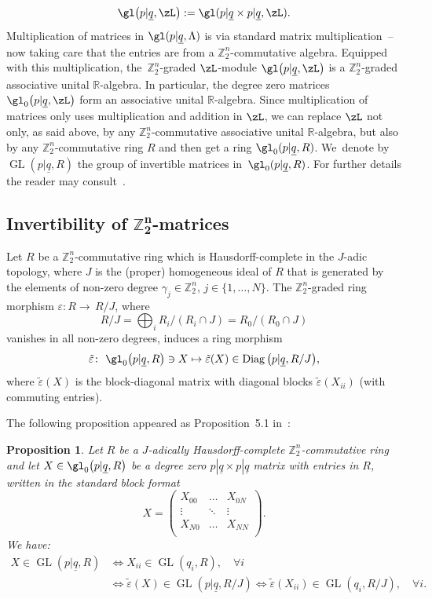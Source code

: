 \documentclass[pdftex]{sigma}%
\newcommand{\op}[1]{\operatorname{#1}}
\DeclareMathOperator{\GL}{GL}
\newcommand{\R}{{\mathbb R}}
\newcommand{\Z}{{\mathbb Z}}
\def\ul{\underline}
\def\ul{\underline}
\newcommand{\0}{\otimes}
\newcommand{\z}{\Z_2^n}
\numberwithin{equation}{section}
\newtheorem{Proposition}[Theorem]{Proposition}
 { \theoremstyle{definition}
\newtheorem{Definition}[Theorem]{Definition}
\newtheorem{Example}[Theorem]{Example}
\newtheorem{Remark}[Theorem]{Remark} }
\begin{document}
\[
\gl\big(p|\ul q,\zL\big):=\gl(p|\ul q \times p|\ul q,\zL).
\]
Multiplication of matrices in $\gl(p|\ul{q},\Lambda)$ is via standard matrix multiplication~-- now taking care that the entries are from a $\Z_2^n$-commutative algebra. Equipped with this multiplication, the~$\z$-graded $\zL$-module $\gl\big(p|\ul q,\zL\big)$ is a $\z$-graded associative unital $\R$-algebra. In particular, the degree zero matrices $\gl_0\big(p|\ul q,\zL\big)$ form an associative unital $\R$-algebra. Since multiplication of matrices only uses multiplication and addition in $\zL$, we can replace $\zL$ not only, as said above, by any $\z$-commutative associative unital $\R$-algebra, but also by any $\z$-commutative ring $R$ and then get a ring $\gl_0(p|\ul q,R)$. We~denote by $\GL(p|\ul q,R)$ the group of invertible matrices in~$\gl_0(p|\ul q,R)$. For further details the reader may consult~\cite{Covolo:2012}.

\subsection[Invertibility of Z2n-matrices]{Invertibility of $\boldsymbol{\z}$-matrices}
Let $R$ be a $\z$-commutative ring which is Hausdorff-complete in the $J$-adic topology, where
$J$ is the (proper) homogeneous ideal of $R$ that is generated by the elements of non-zero degree $\gamma_j\in\Z_2^n$, $j\in\{1,\dots,N\}$. The $\Z_2^n$-graded ring morphism
$\varepsilon\colon R \to \,R/J$, where
\[
R/J=\bigoplus_iR_i/(R_i\cap J)=R_0/(R_0\cap J)
\]
vanishes in all non-zero degrees, induces a ring morphism
\[
\tilde\varepsilon\colon\ \gl_0\big(p|\ul{q},R\big)\ni X\mapsto \tilde\varepsilon(X)\in\op{Diag}\big(p|\ul{q},R/J\big),
\]
where $\tilde\varepsilon(X)$ is the
block-diagonal matrix with diagonal blocks $\tilde\varepsilon(X_{ii})$ (with commuting entries).

The following proposition appeared as Proposition~5.1 in~\cite{CKP2020}:

\begin{Proposition}\label{invertibleblockdiag}
Let $R$ be a $J$-adically Hausdorff-complete $\z$-commutative ring and let $X\in\gl_0\big(p|\ul{q},R\big)$ be a degree zero $p|{\ul q}\times p|{\ul q}$ matrix with entries in $R$, written in the
standard block format
\begin{equation*}
X = \left(\begin{array}{c|c|c}
X_{00} & \dotsc & X_{0N} \\
\hline
\vdots & \ddots & \vdots \\
\hline
X_{N0} & \dotsc & X_{NN} \\
\end{array}\right)\!.
\end{equation*}
We have:
\begin{align*}
X\in\GL(p|\ul q,R)& \Leftrightarrow X_{ii}\in\GL(q_i,R),\quad\forall i\\
&\Leftrightarrow\tilde\varepsilon(X)\in\GL(p|\ul q,R/J)
\Leftrightarrow \tilde\varepsilon(X_{ii})\in\GL(q_i,R/J),\quad\forall i.
\end{align*}
\end{Proposition}
\end{document}
